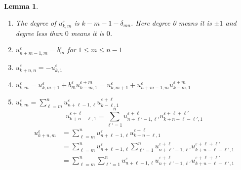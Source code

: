\documentclass{amsart}
\newtheorem{lemma}[theorem]{Lemma}
\numberwithin{theorem}{section}
\begin{document}
  \begin{lemma}
    \mbox{}
    \begin{enumerate}
      \item The degree of $u_{k,m}^\varepsilon$ is $k-m-1-\delta_{mn}$.
        Here degree 0 means it is $\pm 1$ and degree less than $0$ means it is $0$.
      \item $u_{n+m-1,m}^\varepsilon=b_m^\varepsilon$ for $1\le m\le n-1$
      \item $u_{k+n,n}^\varepsilon = -u_{k,1}^\varepsilon$
      \item $u_{k,m}^\varepsilon = u_{k,m+1}^\varepsilon + b_m^\varepsilon u_{k-m,1}^{\varepsilon+m} = u_{k,m+1}^\varepsilon + u_{n+m-1,m}^\varepsilon u_{k-m,1}^{\varepsilon+m}$
      \item $u_{k,m}^\varepsilon = \sum\limits_{\ell=m}^n u_{n+\ell-1,\ell}^\varepsilon u_{k-\ell,1}^{\varepsilon+\ell}$
        \[u_{k+n-\ell,1}^{\varepsilon+\ell} = \sum\limits_{\ell'=1}^n u_{n+\ell'-1,\ell'}^{\varepsilon+\ell} u_{k+n-\ell-\ell',1}^{\varepsilon+\ell+\ell'}\]
        \begin{align*}
          u_{k+n,m}^\varepsilon 
          &=
          \sum\limits_{\ell=m}^n u_{n+\ell-1,\ell}^\varepsilon u_{k+n-\ell,1}^{\varepsilon+\ell} \\
          &=
          \sum\limits_{\ell=m}^n u_{n+\ell-1,\ell}^\varepsilon \sum\limits_{\ell'=1}^n u_{n+\ell'-1,\ell'}^{\varepsilon+\ell} u_{k+n-\ell-\ell',1}^{\varepsilon+\ell+\ell'} \\
          &=
          \sum\limits_{\ell=m}^n \sum\limits_{\ell'=1}^n u_{n+\ell-1,\ell}^\varepsilon u_{n+\ell'-1,\ell'}^{\varepsilon+\ell} u_{k+n-\ell-\ell',1}^{\varepsilon+\ell+\ell'} \\
        \end{align*}
    \end{enumerate}
  \end{lemma}
\end{document}
